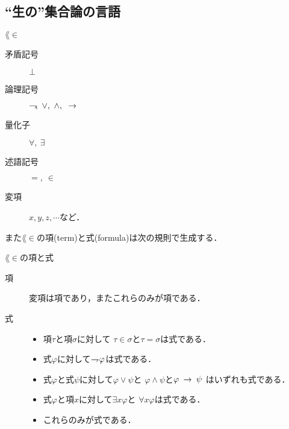 \newpage
\subsection{``生の''集合論の言語}
	\begin{itembox}[l]{$\lang{\in}$}
		\begin{description}
			\item[矛盾記号] $\bot$
			\item[論理記号] $\negation,\ \vee,\ \wedge,\ \rarrow$
			\item[量化子] $\forall,\ \exists$
			\item[述語記号] $=,\ \in$
			\item[変項] $x,y,z,\cdots$など．
		\end{description}
	\end{itembox}
	
	また$\lang{\in}$の項(term)と式(formula)は次の規則で生成する．
	
	\begin{itembox}[l]{$\lang{\in}$の項と式}
		\begin{description}
			\item[項] 変項は項であり，またこれらのみが項である．
				
			\item[式] 
				\begin{itemize}
					\item 項$\tau$と項$\sigma$に対して
						$\tau \in \sigma$と$\tau = \sigma$は式である．
					\item 式$\varphi$に対して$\rightharpoondown\hspace{-0.25em} \varphi$は式である．
					\item 式$\varphi$と式$\psi$に対して$\varphi \vee \psi$と
						$\varphi \wedge \psi$と$\varphi \hspace{0.25em}\rightarrow\hspace{0.25em} \psi$
						はいずれも式である．
					\item 式$\varphi$と項$x$に対して$\exists x \varphi$と
						$\forall x \varphi$は式である．
					\item これらのみが式である．
				\end{itemize}
		\end{description}
	\end{itembox}
	
